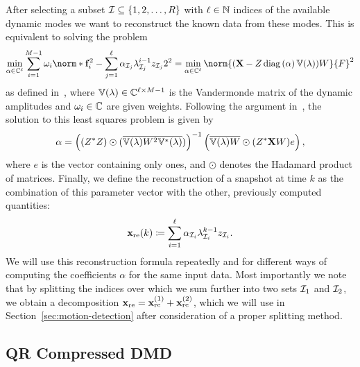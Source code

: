 After selecting a subset $\mathcal{I} \subseteq \left\{1, 2, \dots, R\right\}$ with $\ell \in \mathbb{N}$ indices of the available dynamic modes we want to reconstruct the known data from these modes. This is equivalent to solving the problem
\begin{equation*}
    \min\limits_{\alpha \in \bb{C}^\ell} \sum\limits_{i = 1}^{M - 1} \omega_i \norm*{\bl{f}_i^2 - \sum\limits_{j = 1}^\ell \alpha_{\cl{I}_j} \lambda_{\cl{I}_j}^{i - 1} z_{\cl{I}_j}}{2}^2 = \min\limits_{\alpha \in \bb{C}^\ell} \norm{(\bl{X} - Z \diag{\alpha} \bb{V}(\lambda)) W}{F}^2
\end{equation*}
as defined in~\cite[Equation~(3.1)]{Drmac2020VandermondeKhatriRao}, where $\mathbb{V}(\lambda) \in \mathbb{C}^{\ell \times M - 1}$ is the Vandermonde matrix of the dynamic amplitudes and $\omega_i \in \mathbb{C}$ are given weights. Following the argument in~\cite{Drmac2020VandermondeKhatriRao}, the solution to this least squares problem is given by
\begin{equation}\label{eq:coefficients}
    \alpha = {\left( (Z^* Z) \odot (\overline{\mathbb{V}(\lambda) W^2 \mathbb{V}^*(\lambda)}) \right)}^{-1} \left( \overline{\mathbb{V}(\lambda) W} \odot (Z^* \mathbf{X} W) e \right),
\end{equation}
where $e$ is the vector containing only ones, and $\odot$ denotes the Hadamard product of matrices. Finally, we define the reconstruction of a snapshot at time $k$ as the combination of this parameter vector with the other, previously computed quantities:
\begin{equation}\label{eq:reconstruction}
    \mathbf{x}_\text{re}(k) \coloneqq \sum\limits_{i = 1}^\ell \alpha_{\mathcal{I}_i} \lambda_{\mathcal{I}_i}^{k - 1} z_{\mathcal{I}_i}.
\end{equation}
We will use this reconstruction formula repeatedly and for different ways of computing the coefficients $\alpha$ for the same input data. Most importantly we note that by splitting the indices over which we sum further into two sets $\mathcal{I}_1$ and $\mathcal{I}_2$, we obtain a decomposition $\mathbf{x}_\text{re} = \mathbf{x}_\text{re}^{(1)} + \mathbf{x}_\text{re}^{(2)}$, which we will use in Section~\ref{sec:motion-detection} after consideration of a proper splitting method.

\subsection{QR Compressed DMD}\label{subsec:qr-compression} %

